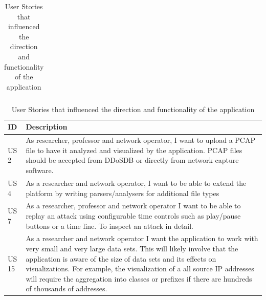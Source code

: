 \begin{table}[]
\begin{tabular}{|p{1.1cm}|p{12cm}|}
\end{tabular}
\caption{User Stories that influenced the direction and functionality of the application}
\label{table:1}
\end{table}               





\begin{table}[]
\centering
\begin{tabular}{|p{1.1cm}|p{12cm}|}
\hline
\textbf{ID} & \textbf{Description} \\ \hline

US 2         & As researcher, professor and network operator, I want to upload a PCAP file to have it analyzed and  visualized by the application. PCAP files should be accepted from DDoSDB or directly from network capture software.\\ \hline

US 4         & As a researcher and network operator, I want to be able to extend the platform by writing parsers/analysers for additional file types\\ \hline

US 7         & As a researcher, professor and network operator I want to be able to replay an attack using configurable time controls such as play/pause buttons or a time line. To inspect an attack in detail.\\ \hline
US 15       & As a researcher and network operator I want the application to work with very small and very large data sets. This will likely involve that the application is aware of the size of data sets and its effects on visualizations\cite{appliedsecurityvisualizations}. For example, the visualization of a all source IP addresses will require the aggregation into classes or prefixes if there are hundreds of thousands of addresses.\\ \hline

\end{tabular}
\caption{User Stories that influenced the direction and functionality of the application}
\label{table:1}
\end{table} 





